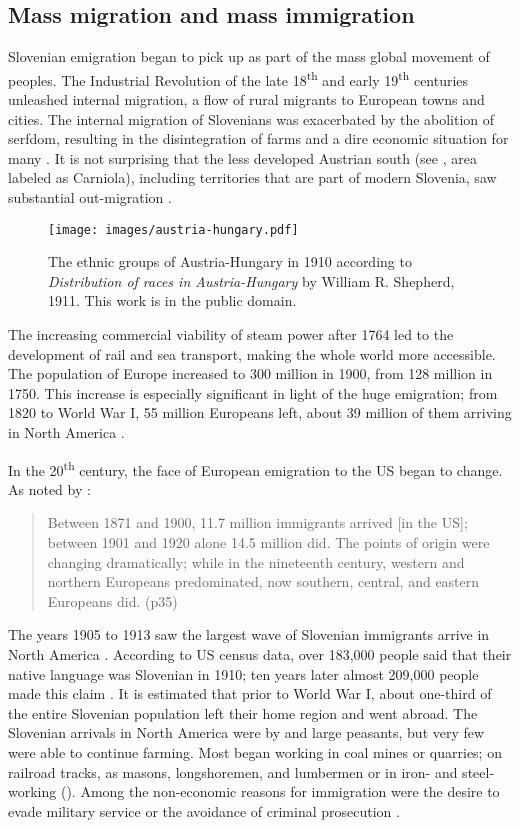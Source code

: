 \documentclass[output=paper,colorlinks,citecolor=brown,arabicfont,chinesefont]{langscibook}
\begin{document}
\subsection{Mass migration and mass immigration}

Slovenian emigration began to pick up as part of the mass global movement of peoples. The Industrial Revolution of the late 18\textsuperscript{th} and early 19\textsuperscript{th} centuries unleashed internal migration, a flow of rural migrants to European towns and cities. The internal migration of Slovenians was exacerbated by the abolition of serfdom, resulting in the disintegration of farms and a dire economic situation for many \citep{Zugel1987}. It is not surprising that the less developed Austrian south (see , area labeled as Carniola), including territories that are part of modern Slovenia, saw substantial out-migration \citep{Drnovse2001}.

\begin{figure}
\texttt{[image: images/austria-hungary.pdf]}
\caption{The ethnic groups of Austria-Hungary in 1910 according to 
\emph{Distribution of races in Austria-Hungary} by William R. Shepherd, 1911. This work is in the public domain.}
\label{vrbinc:fig3}
\end{figure}

The increasing commercial viability of steam power after 1764 led to the development of rail and sea transport, making the whole world more accessible. The population of Europe increased to 300 million in 1900, from 128 million in 1750. This increase is especially significant in light of the huge emigration; from 1820 to World War I, 55 million Europeans left, about 39 million of them arriving in North America \citep{Ferrie2013}. 

In the 20\textsuperscript{th} century, the face of European emigration to the US began to change. As noted by \citet{Gerber2011}:

\begin{quote}
    Between 1871  and 1900, 11.7 million immigrants arrived [in the US]; between 1901 and 1920 alone 14.5 million did. The points of origin were changing dramatically; while in the nineteenth century, western and northern Europeans predominated, now southern, central, and eastern Europeans did. (p35)
\end{quote}

The years 1905 to 1913 saw the largest wave of Slovenian immigrants arrive in North America \citep{Gobetz2014}. According to US census data, over 183,000 people said that their native language was Slovenian in 1910; ten years later almost 209,000 people made this claim \citep{Drnovsek1994}. It is estimated that prior to World War I, about one-third of the entire Slovenian population left their home region and went abroad. The Slovenian arrivals in North America were by and large peasants, but very few were able to continue farming. Most began working in coal mines or quarries; on railroad tracks, as masons, longshoremen, and lumbermen or in iron- and steel-working (\citealt{Zugel1987, Prisland1950}). Among the non-economic reasons for immigration were the desire to evade military service or the avoidance of criminal prosecution \citep{Drnovse2001}.
\end{document}
